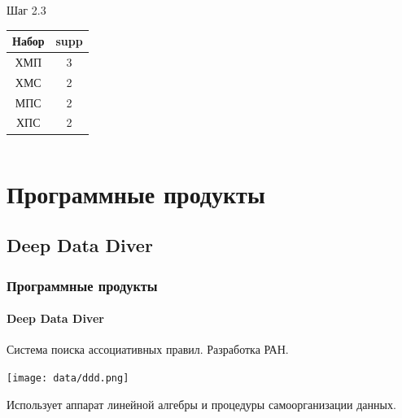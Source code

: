 \documentclass[xcolor=table]{beamer}
\begin{document}
\begin{frame}
\begin{columns}[t]
    \begin{column}{0.3\textwidth}
      \begin{center}
        Шаг 2.3
        \begin{tabular}{|c|c|}
          \hline
          Набор & supp \\ \hline
          \cellcolor{cell2} ХМП & \cellcolor{cell2} 3 \\ \hline
          ХМС & 2 \\ \hline
          МПС & 2 \\ \hline
          ХПС & 2 \\ \hline
        \end{tabular}
      \end{center}
    \end{column}
    
  \end{columns}

\end{frame}

\section{Программные продукты}
\subsection{Deep Data Diver}
\begin{frame}
  \frametitle{Программные продукты}
  \framesubtitle{Deep Data Diver}
  \begin{center}
    \vspace{-5pt}
    Система поиска ассоциативных правил. Разработка РАН. \\
    \vspace{5pt}
    
    {\texttt{[image: data/ddd.png]}}
    
    \vspace{5pt}
  
    Использует аппарат линейной алгебры и процедуры самоорганизации данных.
  \end{center}  
\end{frame}
\end{document}
